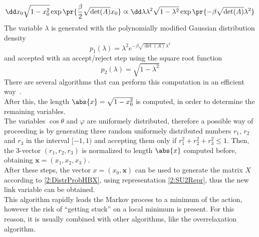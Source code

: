 \begin{equation}
    \dd x_0\sqrt{1-x_0^2} \exp\pr{\frac\beta2 \sqrt{\det(A)}x_0} \varpropto \dd\lambda\lambda^2\sqrt{1-\lambda^2} \exp\pr{-\beta \sqrt{\det(A)}\lambda^2} \label{2:LambdaDistrHB}
\end{equation}
The variable $\lambda$ is generated with the polynomially modified Gaussian distribution density
\begin{equation}
    p_1(\lambda) = \lambda^2 e^{-\beta \sqrt{\det(A)}\lambda^2}
\end{equation}
and accepted with an accept/reject step using the square root function
\begin{equation}
    p_2(\lambda) = \sqrt{1-\lambda^2}
\end{equation}
There are several algorithms that can perform this computation in an efficient way~\cite{1998art, luscher1994portable}.\\
After this, the length $\abs{x} = \sqrt{1-x_0^2}$ is computed, in order to determine the remaining variables.\\
The variables $\cos\theta$ and $\varphi$ are uniformely distributed, therefore a possible way of proceeding is by generating three random uniformely distributed numbers $r_1$, $r_2$ and $r_3$ in the interval $[-1,1)$ and accepting them only if $r_1^2+r_2^2+r_3^2\leq1$.
Then, the $3$-vector $(r_1,r_2,r_3)$ is normalized to length $\abs{x}$ computed before, obtaining $\bm{x} = (x_1,x_2,x_3)$.\\
After these steps, the vector $x=(x_0,\bm{x})$ can be used to generate the matrix $X$ according to \eqref{2:DistrProbHBX}, using representation \eqref{2:SU2Repr}, thus the new link variable can be obtained.\\
This algorithm rapidly leads the Markov process to a minimum of the action, however the risk of ``getting stuck'' on a local minimum is present.
For this reason, it is usually combined with other algorithms, like the overrelaxation algorithm.

